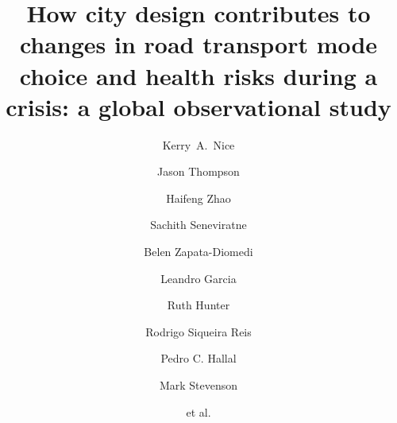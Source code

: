 \documentclass[preprint,10pt]{elsarticle} %
\begin{document}
\begin{frontmatter}



\title{How city design contributes to changes in road transport mode choice and health risks during a crisis: a global observational study}


\author[melb]{Kerry~A.~Nice}
\author[melb]{Jason Thompson}
\author[melb]{Haifeng Zhao}
\author[melb]{Sachith Seneviratne}
\author[RMII]{Belen Zapata-Diomedi}
\author[Belfast]{Leandro Garcia}
\author[Belfast]{Ruth Hunter}
\author[wash]{Rodrigo Siqueira Reis}
\author[uill]{Pedro C. Hallal}
\author[melb,eng]{Mark Stevenson}
\author[]{et al.}

\address[melb]{Transport, Health, and Urban Systems Research Lab, Faculty of Architecture, Building, and Planning, University of Melbourne, VIC, Australia.}
\address[RMII]{Healthy Liveable Cities Lab, Centre for Urban Research, RMIT University, Melbourne, Australia.}
\address[Belfast]{Centre for Public Health, Queen’s University Belfast, Institute of Clinical Sciences B, Belfast, Northern Ireland, UK.}
\address[wash]{Washington University, St. Louis, Missouri, US.}
\address[eng]{Faculty of Engineering and Information Technology and the Melbourne School of Population and Global Health, University of Melbourne, VIC, Australia.}
\address[uill]{Department of Kinesiology and Community Health, University of Illinois Urbana-Champaign}


\end{frontmatter}
\end{document}

